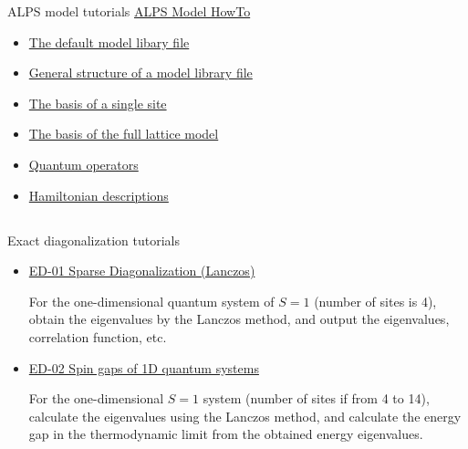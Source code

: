 \begin{frame}[t,fragile]{ALPS model tutorials}
  \href{http://alps.comp-phys.org/mediawiki/index.php/Tutorials:ModelHOWTO}{ALPS Model HowTo} \\
  \begin{itemize}
  \item \href{http://alps.comp-phys.org/mediawiki/index.php/Tutorials:ModelHOWTO#The_default_model_libary_file}{The default model libary file}
  \item \href{http://alps.comp-phys.org/mediawiki/index.php/Tutorials:ModelHOWTO#General_structure_of_a_model_library_file}{General structure of a model library file}
  \item \href{http://alps.comp-phys.org/mediawiki/index.php/Tutorials:ModelHOWTO#The_basis_of_a_single_site}{The basis of a single site}
  \item \href{http://alps.comp-phys.org/mediawiki/index.php/Tutorials:ModelHOWTO#The_basis_of_the_full_lattice_model}{The basis of the full lattice model}
  \item \href{http://alps.comp-phys.org/mediawiki/index.php/Tutorials:ModelHOWTO#Quantum_operators}{Quantum operators}
  \item \href{http://alps.comp-phys.org/mediawiki/index.php/Tutorials:ModelHOWTO#Hamiltonian_descriptions}{Hamiltonian descriptions}
  \end{itemize}
\end{frame}

\subsection*{\redm\whiteb\greenm}
\begin{frame}[t,fragile]{Exact diagonalization tutorials}
  \begin{itemize}
    \setlength{\itemsep}{1em}
  \item \href{http://alps.comp-phys.org/mediawiki/index.php/ALPS_2_Tutorials:ED-01_SparseDiagonalization}{ED-01 Sparse Diagonalization (Lanczos)}

    For the one-dimensional quantum system of $S =1$ (number of sites
    is 4), obtain the eigenvalues by the Lanczos method, and output
    the eigenvalues, correlation function, etc.

  \item \href{http://alps.comp-phys.org/mediawiki/index.php/ALPS_2_Tutorials:ED-02_Gaps}{ED-02 Spin gaps of 1D quantum systems}
    
    For the one-dimensional $S=1$ system (number of sites if from 4
    to 14), calculate the eigenvalues using the Lanczos method, and
    calculate the energy gap in the thermodynamic limit from the
    obtained energy eigenvalues.

  \end{itemize}
\end{frame}

